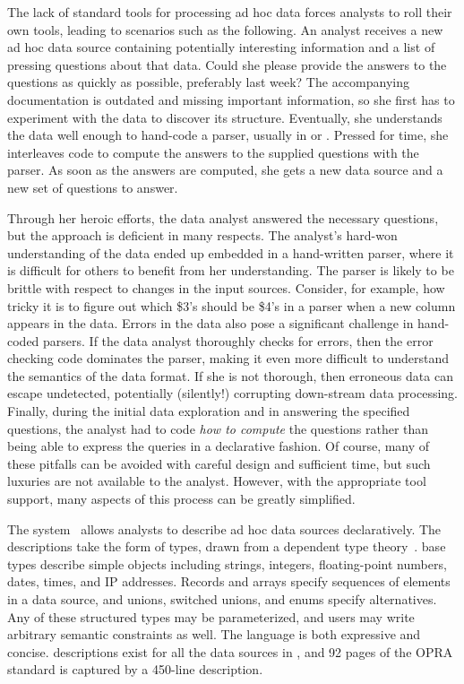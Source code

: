 The lack of standard tools for processing ad hoc data forces
analysts to roll their own tools, leading to scenarios such as the
following.  An analyst receives a new ad hoc data source containing
potentially interesting information and a list of pressing questions
about that data.  Could she please provide the answers to the
questions as quickly as possible, preferably last week?  The
accompanying documentation is outdated and missing important
information, so she first has to experiment with the data to discover
its structure.   Eventually, she understands the data well enough to hand-code a
parser, usually in \C{} or \perl{}.  Pressed for time, she interleaves
code to compute the answers to the supplied questions with the parser.
As soon as the answers are computed, she gets a new data source and a
new set of questions to answer.

Through her heroic efforts, the data analyst answered the necessary
questions, but the approach is deficient in many respects.  The
analyst's hard-won understanding of the data ended up embedded in a
hand-written parser, where it is difficult for others to benefit from
her understanding.  The parser is likely to be brittle with respect to
changes in the input sources.  Consider, for example, how tricky it is
to figure out which \$3's should be \$4's in a \perl{} parser when a
new column appears in the data.  Errors in the data also pose a
significant challenge in hand-coded parsers.  If the data analyst
thoroughly checks for errors, then the error checking code dominates
the parser, making it even more difficult to understand the semantics
of the data format.  If she is not thorough, then erroneous data can
escape undetected, potentially (silently!)  corrupting down-stream
data processing.  Finally, during the initial data exploration and in
answering the specified questions, the analyst had to code \textit{how
to compute} the questions rather than being able to express the
queries in a declarative fashion.  Of course, many of these pitfalls
can be avoided with careful design and sufficient time, but such
luxuries are not available to the analyst.  However, with the
appropriate tool support, many aspects of this process can be greatly
simplified.

The \pads{} system~\cite{fisher+:pldi05} allows analysts to describe
ad hoc data sources declaratively.  The descriptions take the form of
types, drawn from a dependent type theory~\cite{fisher+:popl06}.
\pads{} base types describe simple objects including strings,
integers, floating-point numbers, dates, times, and IP addresses.
Records and arrays specify sequences of elements in a data source, and
unions, switched unions, and enums specify alternatives.  Any of these
structured types may be parameterized, and users may write arbitrary
semantic constraints as well.  The \pads{} language is both expressive
and concise.  \pads{} descriptions exist for all the data sources in
, and 92 pages of the OPRA standard is
captured by a 450-line \pads{} description.

